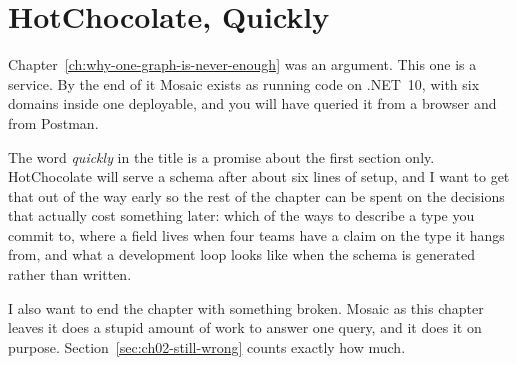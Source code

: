 \chapter{HotChocolate, Quickly}
\label{ch:hotchocolate-quickly}

Chapter~\ref{ch:why-one-graph-is-never-enough} was an argument. This one is a
service. By the end of it Mosaic exists as running code on .NET~10, with six
domains inside one deployable, and you will have queried it from a browser and
from Postman.

The word \emph{quickly} in the title is a promise about the first section only.
HotChocolate will serve a schema after about six lines of setup, and I want to
get that out of the way early so the rest of the chapter can be spent on the
decisions that actually cost something later: which of the ways to describe a
type you commit to, where a field lives when four teams have a claim on the type
it hangs from, and what a development loop looks like when the schema is
generated rather than written.

I also want to end the chapter with something broken. Mosaic as this chapter
leaves it does a stupid amount of work to answer one query, and it does it on
purpose. Section~\ref{sec:ch02-still-wrong} counts exactly how much.









